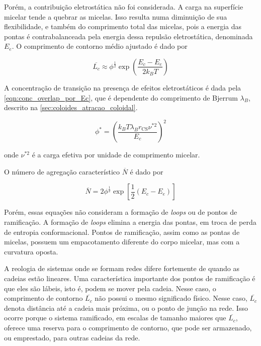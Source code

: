		Porém, a contribuição eletrostática não foi considerada. A carga na superfície micelar tende a quebrar as micelas. Isso resulta numa diminuição de sua flexibilidade, e também do comprimento total das micelas, pois a energia das pontas é contrabalanceada pela energia dessa repulsão eletrostática, denominada \(E_e\). O comprimento de contorno médio ajustado é dado por \cite{Magid2000b, Mackintosh1990}
		
		\begin{equation}
			\overline{L_c} \approx \phi^{\frac{1}{2}} \exp \left(\dfrac{E_c - E_e}{2k_BT}\right)
			\label{eqn:l_contorno_carregada}
		\end{equation}

		A concentração de transição na presença de efeitos eletrostáticos é dada pela \autoref{eqn:conc_overlap_por_Ec}\cite{Magid2000b, Mackintosh1990}, que é dependente do comprimento de Bjerrum \(\lambda_B\), descrito na \autoref{sec:coloides_atracao_coloidal}.
		
 		\begin{equation}
			\phi^* = \left( \frac{k_B T \lambda_B r_{\mathrm{CS}} \nu^{*2}}{E_c} \right) ^ 2
			\label{eqn:conc_overlap_por_Ec}
		\end{equation} 
	
		\noindent onde \(\nu^{*2}\) é a carga efetiva por unidade de comprimento micelar.
		 
		O número de agregação característico \(\overline{N}\) é dado por \cite{Mackintosh1990}
		
		\begin{equation}
			\overline{N} = 2 \phi ^{\frac{1}{2}} \exp \left[ \frac{1}{2} \left( E_c - E_e \right) \right]
			\label{eqn:distrib_tamanhos_micelas}
		\end{equation} 
		 
		Porém, essas equações não consideram a formação de \emph{loops} ou de pontos de ramificação. A formação de \emph{loops} elimina a energia das pontas, em troca de perda de entropia conformacional. Pontos de ramificação, assim como as pontas de micelas, possuem um empacotamento diferente do corpo micelar, mas com a curvatura oposta.
		
		A reologia de sistemas onde se formam redes difere fortemente de quando as cadeias estão lineares.\cite{Cates2006, Lequeux1992a} Uma característica importante dos pontos de ramificação é que eles são lábeis, isto é, podem se mover pela cadeia. Nesse caso, o comprimento de contorno \(\overline{L_c}\) não possui o mesmo significado físico. Nesse caso, \(\overline{L_c}\) denota distância até a cadeia mais próxima, ou o ponto de junção na rede. Isso ocorre porque o sistema ramificado, em escalas de tamanho maiores que \(\overline{L_c}\), oferece uma reserva para o comprimento de contorno, que pode ser armazenado, ou emprestado, para outras cadeias da rede. \cite{Cates2006} 
		
